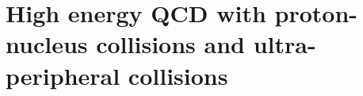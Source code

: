 \documentclass[../report.tex]{subfiles}
\begin{document}
\section{High energy QCD with proton-nucleus collisions and ultra-peripheral collisions}









\end{document}
